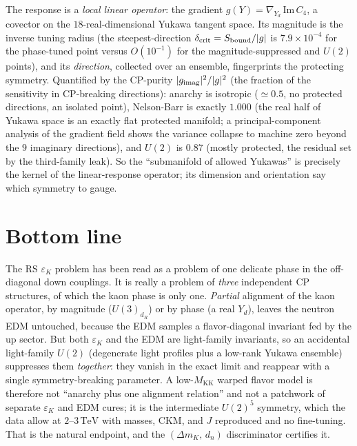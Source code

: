 \documentclass[11pt]{article}
\newcommand{\MKK}{M_{\mathrm{KK}}}
\newcommand{\epsK}{\varepsilon_K}
\newcommand{\dmK}{\Delta m_K}
\newcommand{\TeV}{\,\mathrm{TeV}}
\begin{document}
The response is a \emph{local linear operator}: the gradient
$g(Y)=\nabla_{Y_d}\,\mathrm{Im}\,C_4$, a covector on the $18$-real-dimensional Yukawa
tangent space. Its magnitude is the inverse tuning radius (the steepest-direction
$\delta_{\rm crit}=S_{\rm bound}/|g|$ is $7.9\times10^{-4}$ for the phase-tuned point
versus $O(10^{-1})$ for the magnitude-suppressed and $U(2)$ points), and its
\emph{direction}, collected over an ensemble, fingerprints the protecting symmetry.
Quantified by the CP-purity $|g_{\rm imag}|^2/|g|^2$ (the fraction of the sensitivity
in CP-breaking directions): anarchy is isotropic ($\simeq0.5$, no protected
directions, an isolated point), Nelson-Barr is exactly $1.000$ (the real half of
Yukawa space is an exactly flat protected manifold; a principal-component analysis of
the gradient field shows the variance collapse to machine zero beyond the $9$
imaginary directions), and $U(2)$ is $0.87$ (mostly protected, the residual set by the
third-family leak). So the ``submanifold of allowed Yukawas'' is precisely the kernel
of the linear-response operator; its dimension and orientation say which symmetry to
gauge.

\section{Bottom line}
The RS $\epsK$ problem has been read as a problem of one delicate phase in the
off-diagonal down couplings. It is really a problem of \emph{three} independent CP
structures, of which the kaon phase is only one. \emph{Partial} alignment of the kaon
operator, by magnitude ($U(3)_{d_R}$) or by phase (a real $Y_d$), leaves the neutron EDM
untouched, because the EDM samples a flavor-diagonal invariant fed by the up sector. But
both $\epsK$ and the EDM are light-family invariants, so an accidental light-family
$U(2)$ (degenerate light profiles plus a low-rank Yukawa ensemble) suppresses them
\emph{together}: they vanish in the exact limit and reappear with a single
symmetry-breaking parameter. A low-$\MKK$ warped flavor model is therefore not ``anarchy
plus one alignment relation'' and not a patchwork of separate $\epsK$ and EDM cures; it
is the intermediate $U(2)^5$ symmetry, which the data allow at $2$--$3\TeV$ with masses,
CKM, and $J$ reproduced and no fine-tuning. That is the natural endpoint, and the
$(\dmK,\,d_n)$ discriminator certifies it.
\end{document}
